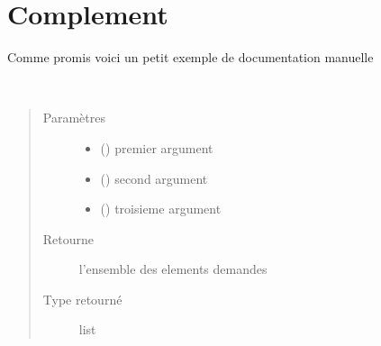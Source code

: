 \documentclass[letterpaper,10pt,french]{sphinxmanual}
\begin{document}
\chapter{Complement}
\label{\detokenize{index:complement}}
Comme promis voici un petit exemple de documentation manuelle

\begin{fulllineitems}
\label{\detokenize{index:ma_fonction}}~\begin{quote}\begin{description}
\item[{Paramètres}] \leavevmode\begin{itemize}
\item {} 
 () \textendash{} premier argument

\item {} 
 () \textendash{} second argument

\item {} 
 () \textendash{} troisieme argument

\end{itemize}

\item[{Retourne}] \leavevmode
l’ensemble des elements demandes

\item[{Type retourné}] \leavevmode
list

\end{description}\end{quote}

\end{fulllineitems}




\renewcommand{\indexname}{Index}
\printindex
\end{document}
